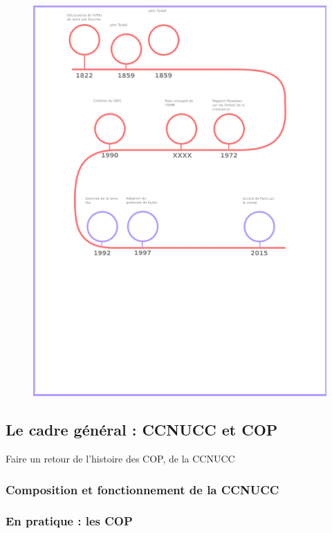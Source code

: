 \begin{figure}
    \centering
    \includegraphics[width=\linewidth]{illustrations/frise.png}
    \label{fig:frise}
\end{figure}

\subsection{Le cadre général : CCNUCC et COP}
\label{sect:1.2.2}
Faire un retour de l'histoire des COP, de la CCNUCC 

\subsubsection{Composition et fonctionnement de la CCNUCC}

\subsubsection{En pratique : les COP}


